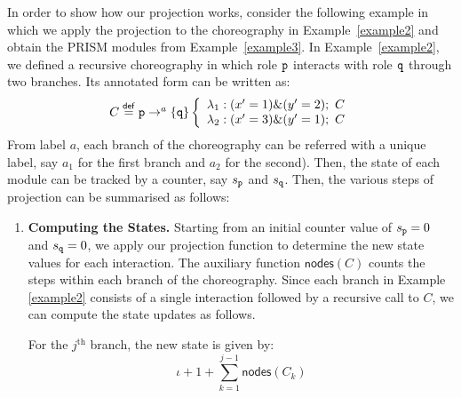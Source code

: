 \begin{example}\label{example-proj}
  In order to show how our projection works, consider the following
  example in which we apply the projection to the choreography in
  Example~\ref{example2} and obtain the PRISM modules from
  Example~\ref{example3}.
  In Example \ref{example2}, we defined a recursive choreography in
  which role \(\mathtt{p}\) interacts with role \(\mathtt{q}\) through two
  branches. Its annotated form can be written as:
  \begin{displaymath}
    \begin{array}{lll}
      C \stackrel{\mathsf{def}}{=} \mathtt{p}\rightarrow^{a} \{\mathtt{q}\}
      \left\{
      \begin{array}{lll}
        \lambda_1: (x'=1)\&(y'=2);\ C
        \\
        \lambda_2: (x'=3)\&(y'=1);\ C
      \end{array}
      \right.
    \end{array}
  \end{displaymath}
  From label $a$, each branch of the choreography can be referred with
  a unique label, say \(a_1\) for the first branch and \(a_2\) for the
  second). Then, the state of each module can be tracked by a counter,
  say \(s_{\mathtt{p}}\) and \(s_{\mathtt{q}}\).
  Then, the various steps of projection can be summarised as follows:
  \begin{enumerate}
  \item \textbf{Computing the States.} Starting from an initial
    counter value of \( s_{\mathtt{p}} = 0 \) and
    \( s_{\mathtt{q}} = 0 \), we apply our projection function to
    determine the new state values for each interaction. The auxiliary
    function \(\mathsf{nodes}(C)\) counts the steps within each branch
    of the choreography. Since each branch in Example \ref{example2}
    consists of a single interaction followed by a recursive call to
    \(C\), we can compute the state updates as follows.
 
    For the \(j^{\text{th}}\) branch, the new state is given by:
    \[
      \iota + 1 + \sum_{k=1}^{j-1} \mathsf{nodes}(C_k)
    \]
 

\end{enumerate}
\end{example}
